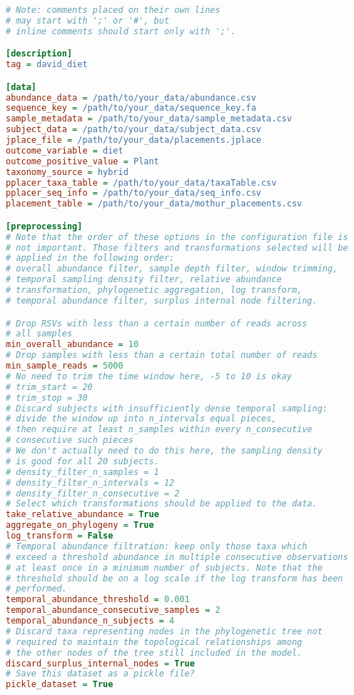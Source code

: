 \documentclass[12pt]{report}
\begin{document}
\begin{lstlisting}[language=Ini,caption=Template MITRE configuration file,numbers=none]
# Note: comments placed on their own lines
# may start with ';' or '#', but
# inline comments should start only with ';'.

[description]
tag = david_diet

[data]
abundance_data = /path/to/your_data/abundance.csv
sequence_key = /path/to/your_data/sequence_key.fa
sample_metadata = /path/to/your_data/sample_metadata.csv
subject_data = /path/to/your_data/subject_data.csv
jplace_file = /path/to/your_data/placements.jplace
outcome_variable = diet
outcome_positive_value = Plant
taxonomy_source = hybrid
pplacer_taxa_table = /path/to/your_data/taxaTable.csv
pplacer_seq_info = /path/to/your_data/seq_info.csv
placement_table = /path/to/your_data/mothur_placements.csv

[preprocessing]
# Note that the order of these options in the configuration file is
# not important. Those filters and transformations selected will be
# applied in the following order:
# overall abundance filter, sample depth filter, window trimming,
# temporal sampling density filter, relative abundance
# transformation, phylogenetic aggregation, log transform,
# temporal abundance filter, surplus internal node filtering.

# Drop RSVs with less than a certain number of reads across
# all samples
min_overall_abundance = 10
# Drop samples with less than a certain total number of reads
min_sample_reads = 5000
# No need to trim the time window here, -5 to 10 is okay
# trim_start = 20
# trim_stop = 30
# Discard subjects with insufficiently dense temporal sampling:
# divide the window up into n_intervals equal pieces,
# then require at least n_samples within every n_consecutive
# consecutive such pieces
# We don't actually need to do this here, the sampling density
# is good for all 20 subjects.
# density_filter_n_samples = 1
# density_filter_n_intervals = 12
# density_filter_n_consecutive = 2
# Select which transformations should be applied to the data.
take_relative_abundance = True
aggregate_on_phylogeny = True
log_transform = False
# Temporal abundance filtration: keep only those taxa which
# exceed a threshold abundance in multiple consecutive observations
# at least once in a minimum number of subjects. Note that the
# threshold should be on a log scale if the log transform has been
# performed.
temporal_abundance_threshold = 0.001
temporal_abundance_consecutive_samples = 2
temporal_abundance_n_subjects = 4
# Discard taxa representing nodes in the phylogenetic tree not
# required to maintain the topological relationships among
# the other nodes of the tree still included in the model.
discard_surplus_internal_nodes = True
# Save this dataset as a pickle file?
pickle_dataset = True


\end{lstlisting}
\end{document}
